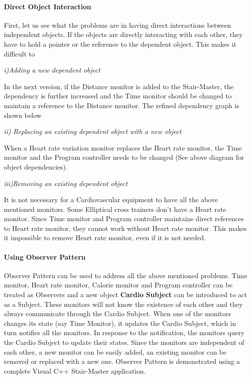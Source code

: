 \documentclass{book}
\begin{document}
\paragraph{Direct Object Interaction}

First, let us see what the problems are in having direct interactions between independent objects.
If the objects are directly interacting with each other, they have to hold a pointer or the reference to the dependent object. This makes it difficult to 

\textit{i)Adding a new dependent object}

In the next version, if the Distance monitor is added to the Stair-Master, the dependency is further increased and the Time monitor should be changed to maintain a reference to the Distance monitor.
The refined dependency graph is shown below
\begin{figure}[H]
\begin{floatrow}
\end{floatrow}
\end{figure}

\textit{ii) Replacing an existing dependent object with a new object}

When a Heart rate variation monitor replaces the Heart rate monitor, the Time monitor and the Program controller needs to be changed (See above diagram for object dependencies).

\textit{iii)Removing an existing dependent object}

It is not necessary for a Cardiovascular equipment to have all the above mentioned monitors. Some Elliptical cross trainers don't have a Heart rate monitor.
Since Time monitor and Program controller maintains direct references to Heart rate monitor, they cannot work without Heart rate monitor.
This makes it impossible to remove Heart rate monitor, even if it is not needed.

\paragraph{Using Observer Pattern}

Observer Pattern can be used to address all the above mentioned problems.
Time monitor, Heart rate monitor, Calorie monitor and Program controller can be treated as Observers and a new object \textbf{Cardio Subject} can be introduced to act as a Subject.
These monitors will not know the existence of each other and they always communicate through the Cardio Subject.
When one of the monitors changes its state (say Time Monitor), it updates the Cardio Subject, which in turn notifies all the monitors.
In response to the notification, the monitors query the Cardio Subject to update their states.
Since the monitors are independent of each other, a new monitor can be easily added, an existing monitor can be removed or replaced with a new one.
Observer Pattern is demonstrated using a complete Visual C++ Stair-Master application.
\end{document}
